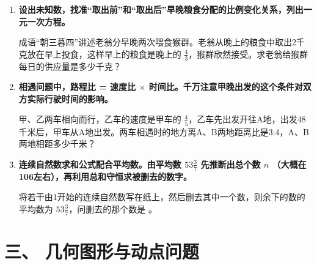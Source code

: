 \documentclass{ctexart}
\begin{document}
\begin{enumerate}
    \item \textbf{设出未知数，找准“取出前”和“取出后”早晚粮食分配的比例变化关系，列出一元一次方程。}
    
    成语“朝三暮四”讲述老翁分早晚两次喂食猴群。老翁从晚上的粮食中取出2千克放在早上投食，这样早上的粮食是晚上的 $\frac{4}{3}$，猴群欣然接受。求老翁给猴群每日的供应量是多少千克？
    \vspace{2cm}

    \item \textbf{相遇问题中，路程比 = 速度比 $\times$ 时间比。千万注意甲晚出发的这个条件对双方实际行驶时间的影响。}
    
    甲、乙两车相向而行，乙车的速度是甲车的 $\frac{4}{5}$，乙车先出发开往A地，出发48千米后，甲车从A地出发。两车相遇时的地方离A、B两地距离比是3:4，A、B两地相距多少千米？
    \vspace{2cm}
    
    \item \textbf{连续自然数求和公式配合平均数。由平均数 $53\frac{3}{7}$ 先推断出总个数 $n$ （大概在106左右），再利用总和守恒求被删去的数字。}
    
    将若干由1开始的连续自然数写在纸上，然后删去其中一个数，则余下的数的平均数为 $53\frac{3}{7}$，问删去的那个数是 \underline{\hspace{2cm}}。
    \vspace{2cm}
\end{enumerate}

\section*{三、 几何图形与动点问题}
\end{document}
